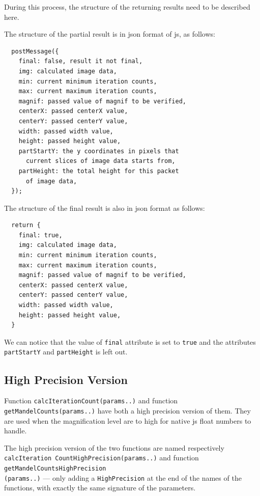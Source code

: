 During this process, the structure of the returning results need to be described here.

The structure of the partial result is in \gls{json} format of \gls{js}, as follows:

\begin{verbatim}
  postMessage({
    final: false, result it not final,
    img: calculated image data,
    min: current minimum iteration counts,
    max: current maximum iteration counts,
    magnif: passed value of magnif to be verified,
    centerX: passed centerX value,
    centerY: passed centerY value,
    width: passed width value,
    height: passed height value,
    partStartY: the y coordinates in pixels that
      current slices of image data starts from,
    partHeight: the total height for this packet
      of image data,
  });
\end{verbatim}

The structure of the final result is also in \gls{json} format as follows:

\begin{verbatim}
  return {
    final: true,
    img: calculated image data,
    min: current minimum iteration counts,
    max: current maximum iteration counts,
    magnif: passed value of magnif to be verified,
    centerX: passed centerX value,
    centerY: passed centerY value,
    width: passed width value,
    height: passed height value,
  }
\end{verbatim}

We can notice that the value of \texttt{final} attribute is set to \texttt{true} and the attributes \texttt{partStartY} and \texttt{partHeight} is left out.

\subsection{High Precision Version}

Function \texttt{calcIterationCount(params..)} and function \texttt{getMandelCounts(params..)} have both a high precision version of them. They are used when the magnification level are to high for native \gls{js} float numbers to handle.

The high precision version of the two functions are named respectively \texttt{calcIteration CountHighPrecision(params..)} and function \texttt{getMandelCountsHighPrecision\\(params..)} --- only adding a \texttt{HighPrecision} at the end of the names of the functions, with exactly the same signature of the parameters.

